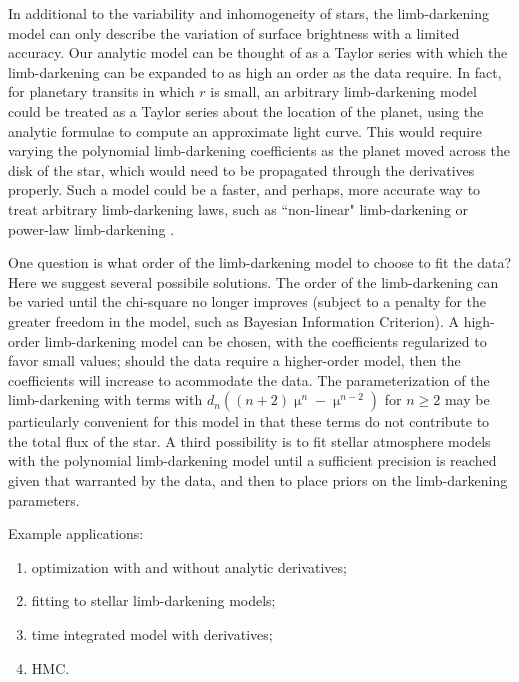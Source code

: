 \documentclass[modern]{aastex61}
\begin{document}
In additional to the variability and inhomogeneity of stars, the limb-darkening model
can only describe the variation of surface brightness with a limited accuracy.
Our analytic model can be thought of as a Taylor series with which the
limb-darkening can be expanded to as high an order as the data require.
In fact, for planetary transits in which $r$ is small, an arbitrary limb-darkening 
model could be treated as a Taylor series about the location of the planet,
using the analytic formulae to compute an approximate light curve.  This
would require varying the polynomial limb-darkening coefficients as the
planet moved across the disk of the star, which would need to be propagated
through the derivatives properly.  Such a model could be a faster, and
perhaps, more accurate way to treat arbitrary limb-darkening laws, such
as ``non-linear" limb-darkening \citep{Claret2000} or power-law limb-darkening
\citep{Maxted2018}.

One question is what order of the limb-darkening model to choose to
fit the data?  Here we suggest several possibile solutions.  The order of the
limb-darkening can be varied until the chi-square no longer improves (subject
to a penalty for the greater freedom in the model, such as Bayesian Information
Criterion).  A high-order limb-darkening model can be chosen, with the
coefficients regularized to favor small values;  should the data require
a higher-order model, then the coefficients will increase to acommodate
the data.  The parameterization of the limb-darkening with terms with
$d_n ((n+2)\upmu^n-\upmu^{n-2})$ for $n \ge 2$ may be particularly
convenient for this model in that these terms do not contribute to the
total flux of the star.  A third possibility is to fit stellar atmosphere
models with the polynomial limb-darkening model until a sufficient precision
is reached given that warranted by the data, and then to place priors
on the limb-darkening parameters. 

Example applications:  
\begin{enumerate}
\item optimization with and without analytic derivatives;
\item fitting to stellar limb-darkening models;
\item time integrated model with derivatives;
\item HMC.
\end{enumerate}
\end{document}
